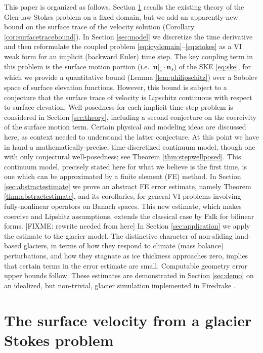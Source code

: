 \documentclass[hidelinks,onefignum,onetabnum,final]{siamart220329}  %
\newcommand{\bn}{\mathbf{n}}
\newcommand{\bu}{\mathbf{u}}
\begin{document}
This paper is organized as follows.  Section \ref{sec:stokes} recalls the existing theory of the Glen-law Stokes problem on a fixed domain, but we add an apparently-new bound on the surface trace of the velocity solution (Corollary \ref{cor:surfacetracebound}).  In Section \ref{sec:model} we discretize the time derivative and then reformulate the coupled problem \eqref{eq:icydomain}--\eqref{eq:stokes} as a VI weak form for an implicit (backward Euler) time step.  The key coupling term in this problem is the surface motion portion (i.e.~$\bu|_s\cdot \bn_s$) of the SKE \eqref{eq:ske}, for which we provide a quantitative bound (Lemma \ref{lem:philipschitz}) over a Sobolev space of surface elevation functions.  However, this bound is subject to a conjecture that the surface trace of velocity is Lipschitz continuous with respect to surface elevation.  Well-posedness for each implicit time-step problem is considered in Section \ref{sec:theory}, including a second conjecture on the coercivity of the surface motion term.  Certain physical and modeling ideas are discussed here, as context needed to understand the latter conjecture.  At this point we have in hand a mathematically-precise, time-discretized continuum model, though one with only conjectural well-posedness; see Theorem \ref{thm:stepwellposed}.  This continuum model, precisely stated here for what we believe is the first time, is one which can be approximated by a finite element (FE) method.  In Section \ref{sec:abstractestimate} we prove an abstract FE error estimate, namely Theorem \ref{thm:abstractestimate}, and its corollaries, for general VI problems involving fully-nonlinear operators on Banach spaces.  This new estimate, which makes coercive and Lipshitz assumptions, extends the classical case by Falk \cite{Falk1974} for bilinear forms.  [FIXME: rewrite needed from here] In Section \ref{sec:application} we apply the estimate to the glacier model.  The distinctive character of non-sliding land-based glaciers, in terms of how they respond to climate (mass balance) perturbations, and how they stagnate as ice thickness approaches zero, implies that certain terms in the error estimate are small.  Computable geometry error upper bounds follow.  These estimates are demonstrated in Section \ref{sec:demo} on an idealized, but non-trivial, glacier simulation implemented in Firedrake \cite{Hametal2023}.


\section{The surface velocity from a glacier Stokes problem} \label{sec:stokes}
\end{document}
